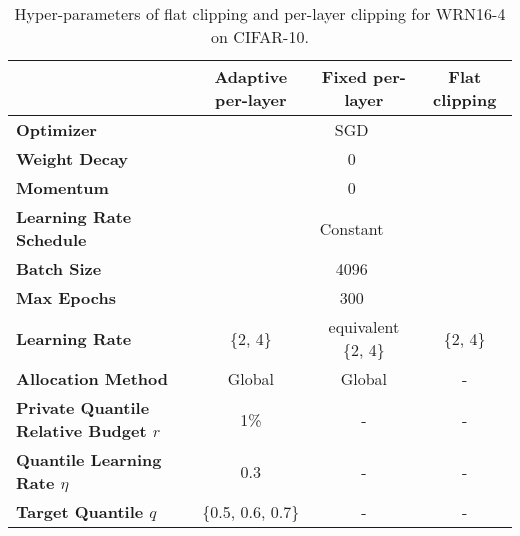 \begin{table*}[ht]
\footnotesize
\setlength\tabcolsep{2.4pt}
\centering 
\caption{Hyper-parameters of flat clipping and per-layer clipping for WRN16-4 on CIFAR-10.} \label{tab:tuning_cifar10}
\begin{tabular}{l c c c}
\toprule
 & Adaptive per-layer & Fixed per-layer & Flat clipping \\
\midrule
\textbf{Optimizer} & \multicolumn{3}{c}{SGD} \\
\textbf{Weight Decay} & \multicolumn{3}{c}{0} \\
\textbf{Momentum} & \multicolumn{3}{c}{0} \\
\textbf{Learning Rate Schedule} & \multicolumn{3}{c}{Constant} \\
\textbf{Batch Size} & \multicolumn{3}{c}{4096} \\
\textbf{Max Epochs} & \multicolumn{3}{c}{300} \\
\midrule
\textbf{Learning Rate} & \{2, 4\} & equivalent \{2, 4\} & \{2, 4\} \\
\textbf{Allocation Method} & Global & Global & - \\

\textbf{Private Quantile Relative Budget $r$} & 1\% & - & -\\
\textbf{Quantile Learning Rate $\eta$} & 0.3 & - & -\\
\textbf{Target Quantile $q$} & \{0.5, 0.6, 0.7\} & - & - \\
\bottomrule
\end{tabular}
\end{table*}

 